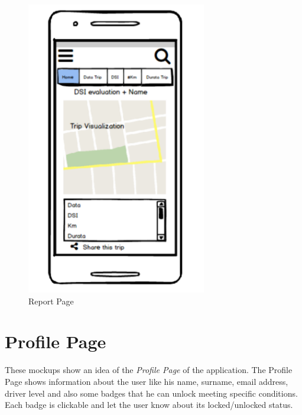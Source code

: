 \begin{figure}[htbp]
\centering
\includegraphics[width=0.7\textwidth]{cpt/img/ReportPage.png}
\caption{Report Page}
\end{figure}

\clearpage
\section{Profile Page}
These mockups show an idea of the \textit{Profile Page} of the application. The Profile Page shows information about the user like his name, surname, email address, driver level and also some badges that he can unlock meeting specific conditions. Each badge is clickable and let the user know about its locked/unlocked status.\\

